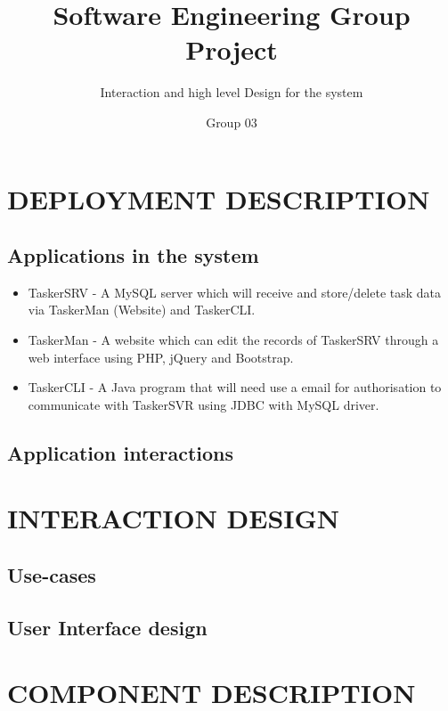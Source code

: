 \documentclass{project}
\begin{document}
\title{Software Engineering Group Project}
\subtitle{Interaction and high level Design for the system}
\author{Group 03}     
\shorttitle{\LaTeX}

\maketitle

\tableofcontents
\newpage


\section{DEPLOYMENT DESCRIPTION}
\subsection{Applications in the system}
\begin{itemize}
\item TaskerSRV - A MySQL server which will receive and store/delete task data via TaskerMan (Website) and TaskerCLI.
\item TaskerMan - A website which can edit the records of TaskerSRV through a web interface using PHP, jQuery and Bootstrap.
\item TaskerCLI - A Java program that will need use a email for authorisation to communicate with TaskerSVR  using JDBC with MySQL driver.

\end{itemize}

\subsection{Application interactions}

\section{INTERACTION DESIGN}
\subsection{Use-cases}
\subsection{User Interface design}

\section{COMPONENT DESCRIPTION}
\end{document}
